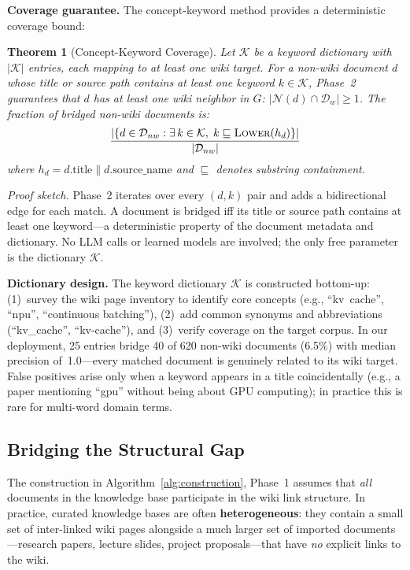 \documentclass[sigconf,review]{acmart}
\newtheorem{theorem}{Theorem}
\begin{document}
\textbf{Coverage guarantee.}
The concept-keyword method provides a deterministic coverage bound:

\begin{theorem}[Concept-Keyword Coverage]
\label{thm:coverage}
Let $\mathcal{K}$ be a keyword dictionary with $|\mathcal{K}|$ entries,
each mapping to at least one wiki target.  For a non-wiki document $d$
whose title or source path contains at least one keyword $k \in \mathcal{K}$,
Phase~2 guarantees that $d$ has at least one wiki neighbor in $G$:
$|\mathcal{N}(d) \cap \mathcal{D}_w| \geq 1$.  The fraction of bridged
non-wiki documents is:
\[
  \frac{|\{d \in \mathcal{D}_{nw} : \exists\, k \in \mathcal{K},\; k \sqsubseteq \textsc{Lower}(h_d)\}|}{|\mathcal{D}_{nw}|}
\]
where $h_d = d.\text{title} \mathbin{\|} d.\text{source\_name}$ and
$\sqsubseteq$ denotes substring containment.
\end{theorem}

\noindent\textit{Proof sketch.}
Phase~2 iterates over every $(d, k)$ pair and adds a bidirectional edge
for each match.  A document is bridged iff its title or source path
contains at least one keyword---a deterministic property of the document
metadata and dictionary.  No LLM calls or learned models are involved;
the only free parameter is the dictionary $\mathcal{K}$.

\textbf{Dictionary design.}
The keyword dictionary $\mathcal{K}$ is constructed bottom-up: (1)~survey
the wiki page inventory to identify core concepts (e.g., ``kv~cache'',
``npu'', ``continuous batching''), (2)~add common synonyms and
abbreviations (``kv\_cache'', ``kv-cache''), and (3)~verify coverage on
the target corpus.  In our deployment, 25 entries bridge 40 of 620
non-wiki documents (6.5\%) with median precision of~1.0---every matched
document is genuinely related to its wiki target.  False positives arise
only when a keyword appears in a title coincidentally (e.g., a paper
mentioning ``gpu'' without being about GPU computing); in practice this
is rare for multi-word domain terms.

\subsection{Bridging the Structural Gap}
\label{sec:structural_gap}

The construction in Algorithm~\ref{alg:construction}, Phase~1 assumes that
\emph{all} documents in the knowledge base participate in the wiki link
structure.  In practice, curated knowledge bases are often
\textbf{heterogeneous}: they contain a small set of inter-linked wiki pages
alongside a much larger set of imported documents---research papers,
lecture slides, project proposals---that have \emph{no} explicit links to
the wiki.
\end{document}
